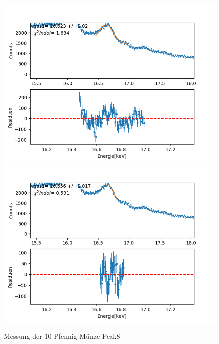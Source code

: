 \documentclass[12pt,a4paper]{article}
\begin{document}
\begin{figure}[H]
\centering
\includegraphics[scale=0.49]{Bilder/roentgen_spektren/pfennig/pfen8_1.png}
\includegraphics[scale=0.49]{Bilder/roentgen_spektren/pfennig/pfen8_2.png}
\caption{Messung der 10-Pfennig-Münze Peak8}
\end{figure}

\newpage
\end{document}
